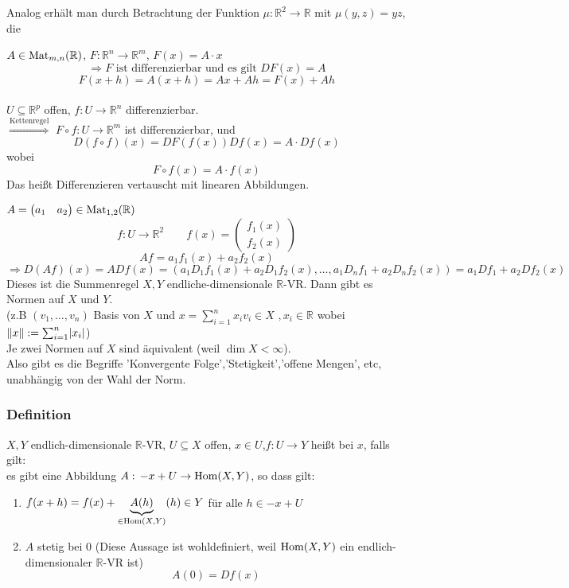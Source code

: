 Analog erhält man durch Betrachtung der Funktion $\mu : \mathbb{R}^2 \to  \mathbb{R}$ mit $\mu(y,z)=yz$, die 

$A \in \operatorname{Mat}_{m,n}(\mathbb{R})$, $F: \mathbb{R}^n \to \mathbb{R}^m$, $F(x)=A \cdot x$
\[
	\Rightarrow F \text{ ist differenzierbar und es gilt } DF(x)=A
\]
\[
	F(x+h)=A(x+h)=Ax+Ah=F(x)+Ah
\] \bewende \\
$U \subseteq \mathbb{R}^p$ offen, $f: U \to \mathbb{R}^n$ differenzierbar. \\
$\stackrel{\text{Kettenregel}}{\Rightarrow}$ $F \circ f: U \to \mathbb{R}^m$ ist differenzierbar, und 
\[
	D(f \circ f)(x)= DF(f(x))Df(x) = A \cdot Df(x)
\]
wobei
\[
	F \circ f(x)=A \cdot f(x)
\]
Das heißt Differenzieren vertauscht mit linearen Abbildungen.

$A= \begin{pmatrix}
	a_1 & a_2
\end{pmatrix} \in \operatorname{Mat}_{1,2}(\mathbb{R})$
\[
	f: U \to \mathbb{R}^2 \qquad f(x)= \begin{pmatrix}
		f_1(x) \\ f_2(x)
	\end{pmatrix}
\]
\[
	Af=a_1f_1(x)+a_2f_2(x)
\]
\[
	\Rightarrow D(Af)(x)= A Df(x) = (a_1D_1f_1(x) + a_2D_1f_2(x), \dots, a_1D_nf_1 + a_2D_nf_2(x)) = a_1Df_1 + a_2Df_2(x) 
\]
Dieses ist die Summenregel
$X,Y$ endliche-dimensionale $\mathbb{R}$-VR. Dann gibt es Normen auf $X$ und $Y$. \\
(z.B $(v_1, \dots , v_n)$ Basis von $X$ und $x = \sum^{n}_{i=1}x_iv_i \in X \,\,,x_i \in \mathbb{R}$ wobei $\norm{x}:= \sum^{n}_{i=1}\abs{x_i}$) \\
Je zwei Normen auf $X$ sind äquivalent (weil $\dim X < \infty$). \\
Also gibt es die Begriffe 'Konvergente Folge','Stetigkeit','offene Mengen', etc, unabhängig von der Wahl der Norm.

\subsubsection{Definition} %
\label{ssub:definition}
$X,Y$ endlich-dimensionale $\mathbb{R}$-VR, $U \subseteq X$ offen, $x \in U$,$f: U \to Y$ heißt  bei $x$, falls gilt: \\
es gibt eine Abbildung $A: \,-x+U \to \operatorname{Hom}(X,Y)$, so dass gilt:
\begin{enumerate}
	\item $f(x+h)=f(x)+\underset{\in \operatorname{Hom}(X,Y)}{\underbrace{A(h)}}(h) \in Y$ für alle $h \in -x+U$
	\item $A$ stetig bei $0$ (Diese Aussage ist wohldefiniert, weil $\operatorname{Hom}(X,Y)$ ein endlich-dimensionaler $\mathbb{R}$-VR ist)
	\[
		A(0)=Df(x)
	\]
\end{enumerate}
